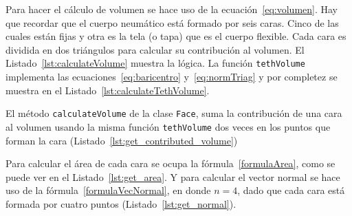 Para hacer el cálculo de volumen se hace uso de la ecuación~\eqref{eq:volumen}.
Hay que recordar que el cuerpo neumático está formado por seis caras.
Cinco de las cuales están fijas y otra es la tela (o tapa) que es el cuerpo flexible.
Cada cara es dividida en dos triángulos para calcular su contribución al volumen.
El Listado~\ref{lst:calculateVolume} muestra la lógica. La función \texttt{tethVolume} implementa las ecuaciones~\eqref{eq:baricentro} y~\eqref{eq:normTriag} y por completez se muestra en el Listado~\ref{lst:calculateTethVolume}.



El método \texttt{calculateVolume} de la clase \texttt{Face}, suma la contribución de una cara al volumen usando la misma función \texttt{tethVolume} dos veces en los puntos que forman la cara (Listado~\ref{lst:get_contributed_volume})


Para calcular el área de cada cara se ocupa la fórmula~\eqref{formulaArea}, como se puede ver en el Listado~\ref{lst:get_area}.
Y para calcular el vector normal se hace uso de la fórmula~\eqref{formulaVecNormal}, en donde $n=4$, dado que cada cara está formada por cuatro puntos (Listado~\ref{lst:get_normal}).


